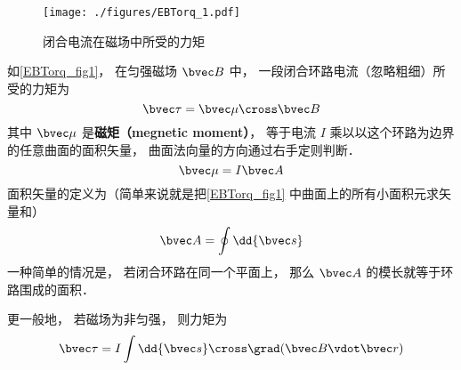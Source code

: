 
\begin{figure}[ht]
\centering
\texttt{[image: ./figures/EBTorq\_1.pdf]}
\caption{闭合电流在磁场中所受的力矩} \label{EBTorq_fig1}
\end{figure}

如\autoref{EBTorq_fig1}， 在匀强磁场 $\bvec B$ 中， 一段闭合环路电流（忽略粗细）所受的力矩为
\begin{equation}\label{EBTorq_eq2}
\bvec \tau = \bvec \mu \cross \bvec B
\end{equation}
其中 $\bvec \mu$ 是\textbf{磁矩（megnetic moment）}， 等于电流 $I$ 乘以以这个环路为边界的任意曲面的面积矢量， 曲面法向量的方向通过右手定则判断．
\begin{equation}
\bvec \mu = I \bvec A
\end{equation}
面积矢量的定义为（简单来说就是把\autoref{EBTorq_fig1} 中曲面上的所有小面积元求矢量和）
\begin{equation}
\bvec A = \oint \dd{\bvec s}
\end{equation}
一种简单的情况是， 若闭合环路在同一个平面上， 那么 $\bvec A$ 的模长就等于环路围成的面积．

更一般地， 若磁场为非匀强， 则力矩为
\begin{equation}\label{EBTorq_eq1}
\bvec \tau = I \int \dd{\bvec s}\cross\grad(\bvec B\vdot\bvec r)
\end{equation}

